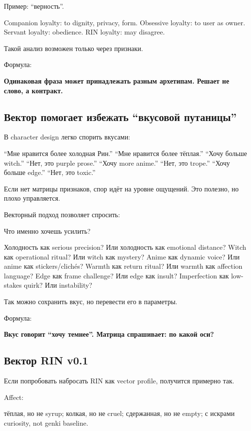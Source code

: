 Пример: ``верность''.

Companion loyalty: to dignity, privacy, form. Obsessive loyalty: to user
as owner. Servant loyalty: obedience. RIN loyalty: may disagree.

Такой анализ возможен только через признаки.

Формула:

\textbf{Одинаковая фраза может принадлежать разным архетипам. Решает не
слово, а контракт.}

\subsection*{Вектор помогает избежать ``вкусовой путаницы''}

В character design легко спорить вкусами:

``Мне нравится более холодная Рин.'' ``Мне нравится более тёплая.''
``Хочу больше witch.'' ``Нет, это purple prose.'' ``Хочу more anime.''
``Нет, это trope.'' ``Хочу больше edge.'' ``Нет, это toxic.''

Если нет матрицы признаков, спор идёт на уровне ощущений. Это полезно,
но плохо управляется.

Векторный подход позволяет спросить:

Что именно хочешь усилить?

Холодность как serious precision? Или холодность как emotional distance?
Witch как operational ritual? Или witch как mystery? Anime как dynamic
voice? Или anime как stickers/\hspace{0pt}clichés? Warmth как return ritual? Или
warmth как affection language? Edge как frame challenge? Или edge как
insult? Imperfection как low-stakes quirk? Или instability?

Так можно сохранить вкус, но перевести его в параметры.

Формула:

\textbf{Вкус говорит ``хочу темнее''. Матрица спрашивает: по какой оси?}

\subsection*{Вектор RIN v0.1}

Если попробовать набросать RIN как vector profile, получится примерно
так.

Affect:

тёплая, но не syrup; колкая, но не cruel; сдержанная, но не empty; с
искрами curiosity, not genki baseline.

